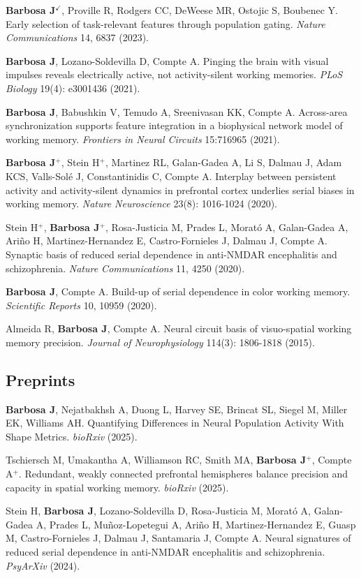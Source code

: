 \documentclass[11pt,a4paper]{article}
\begin{document}
\textbf{Barbosa J}$^{\checkmark}$, Proville R, Rodgers CC, DeWeese MR, Ostojic S, Boubenec Y. Early selection of task-relevant features through population gating. \textit{Nature Communications} 14, 6837 (2023).

\textbf{Barbosa J}, Lozano-Soldevilla D, Compte A. Pinging the brain with visual impulses reveals electrically active, not activity-silent working memories. \textit{PLoS Biology} 19(4): e3001436 (2021).

\textbf{Barbosa J}, Babushkin V, Temudo A, Sreenivasan KK, Compte A. Across-area synchronization supports feature integration in a biophysical network model of working memory. \textit{Frontiers in Neural Circuits} 15:716965 (2021).

\textbf{Barbosa J}$^{+}$, Stein H$^{+}$, Martinez RL, Galan-Gadea A, Li S, Dalmau J, Adam KCS, Valls-Solé J, Constantinidis C, Compte A. Interplay between persistent activity and activity-silent dynamics in prefrontal cortex underlies serial biases in working memory. \textit{Nature Neuroscience} 23(8): 1016-1024 (2020).

Stein H$^{+}$, \textbf{Barbosa J}$^{+}$, Rosa-Justicia M, Prades L, Morató A, Galan-Gadea A, Ariño H, Martinez-Hernandez E, Castro-Fornieles J, Dalmau J, Compte A. Synaptic basis of reduced serial dependence in anti-NMDAR encephalitis and schizophrenia. \textit{Nature Communications} 11, 4250 (2020).

\textbf{Barbosa J}, Compte A. Build-up of serial dependence in color working memory. \textit{Scientific Reports} 10, 10959 (2020).

Almeida R, \textbf{Barbosa J}, Compte A. Neural circuit basis of visuo-spatial working memory precision. \textit{Journal of Neurophysiology} 114(3): 1806-1818 (2015).

\subsection{Preprints}

\textbf{Barbosa J}, Nejatbakhsh A, Duong L, Harvey SE, Brincat SL, Siegel M, Miller EK, Williams AH. Quantifying Differences in Neural Population Activity With Shape Metrics. \textit{bioRxiv} (2025).

Tschiersch M, Umakantha A, Williamson RC, Smith MA, \textbf{Barbosa J}$^{+}$, Compte A$^{+}$. Redundant, weakly connected prefrontal hemispheres balance precision and capacity in spatial working memory. \textit{bioRxiv} (2025).

Stein H, \textbf{Barbosa J}, Lozano-Soldevilla D, Rosa-Justicia M, Morató A, Galan-Gadea A, Prades L, Muñoz-Lopetegui A, Ariño H, Martinez-Hernandez E, Guasp M, Castro-Fornieles J, Dalmau J, Santamaria J, Compte A. Neural signatures of reduced serial dependence in anti-NMDAR encephalitis and schizophrenia. \textit{PsyArXiv} (2024).
\end{document}
